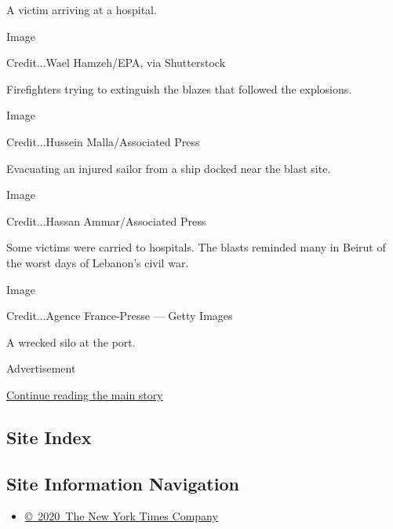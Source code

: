 A victim arriving at a hospital.

Image

Credit...Wael Hamzeh/EPA, via Shutterstock

Firefighters trying to extinguish the blazes that followed the
explosions.

Image

Credit...Hussein Malla/Associated Press

Evacuating an injured sailor from a ship docked near the blast site.

Image

Credit...Hassan Ammar/Associated Press

Some victims were carried to hospitals. The blasts reminded many in
Beirut of the worst days of Lebanon's civil war.

Image

Credit...Agence France-Presse --- Getty Images

A wrecked silo at the port.

Advertisement

\protect\hyperlink{after-bottom}{Continue reading the main story}

\hypertarget{site-index}{%
\subsection{Site Index}\label{site-index}}

\hypertarget{site-information-navigation}{%
\subsection{Site Information
Navigation}\label{site-information-navigation}}

\begin{itemize}
\tightlist
\item
  \href{https://help.nytimes3xbfgragh.onion/hc/en-us/articles/115014792127-Copyright-notice}{©~2020~The
  New York Times Company}
\end{itemize}

